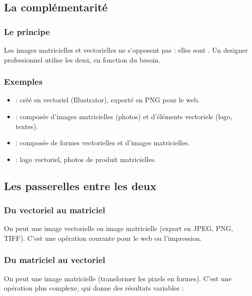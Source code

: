 \subsection{La complémentarité}

\subsubsection{Le principe}

Les images matricielles et vectorielles ne s'opposent pas : elles sont . Un designer professionnel utilise les deux, en fonction du besoin.

\subsubsection{Exemples}

\begin{itemize}
    \item {} : créé en vectoriel (Illustrator), exporté en PNG pour le web.
    \item {} : composée d'images matricielles (photos) et d'éléments vectoriels (logo, textes).
    \item {} : composée de formes vectorielles et d'images matricielles.
    \item {} : logo vectoriel, photos de produit matricielles.
\end{itemize}

\subsection{Les passerelles entre les deux}

\subsubsection{Du vectoriel au matriciel}

On peut  une image vectorielle en image matricielle (export en JPEG, PNG, TIFF). C'est une opération courante pour le web ou l'impression.

\subsubsection{Du matriciel au vectoriel}

On peut  une image matricielle (transformer les pixels en formes). C'est une opération plus complexe, qui donne des résultats variables :


